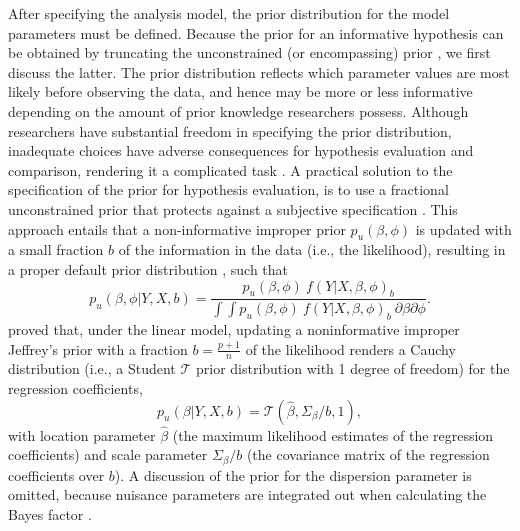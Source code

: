 \documentclass[
  authoryear,
  preprint,
  5p,
  twocolumn]{elsarticle}
\begin{document}
After specifying the analysis model, the prior distribution for the
model parameters must be defined. Because the prior for an informative
hypothesis can be obtained by truncating the unconstrained (or
encompassing) prior \citep[e.g.,][]{klugkist_inequality_2005}, we first
discuss the latter. The prior distribution reflects which parameter
values are most likely before observing the data, and hence may be more
or less informative depending on the amount of prior knowledge
researchers possess. Although researchers have substantial freedom in
specifying the prior distribution, inadequate choices have adverse
consequences for hypothesis evaluation and comparison, rendering it a
complicated task \citep{ohagan_fractional_1995}. A practical solution to
the specification of the prior for hypothesis evaluation, is to use a
fractional unconstrained prior \citep{ohagan_fractional_1995} that
protects against a subjective specification
\citep{gu_approximated_2018}. This approach entails that a
non-informative improper prior \(p_u(\beta, \phi)\) is updated with a
small fraction \(b\) of the information in the data (i.e., the
likelihood), resulting in a proper default prior distribution
\citep[e.g.,][]{mulder_equality_2010, gu_approximated_2018}, such that
\[
p_u(\beta, \phi|Y, X, b) = 
\frac{
  p_u(\beta, \phi) ~ f(Y|X, \beta, \phi)_b
}{
  \int \int p_u(\beta, \phi) ~ f(Y|X, \beta, \phi)_b ~ \partial \beta \partial \phi
}.
\] \citet{mulder_olssoncollentine_2019} proved that, under the linear
model, updating a noninformative improper Jeffrey's prior with a
fraction \(b = \frac{p+1}{n}\) of the likelihood renders a Cauchy
distribution (i.e., a Student \(\mathcal{T}\) prior distribution with 1
degree of freedom) for the regression coefficients, \[
p_u(\beta | Y, X, b) = \mathcal{T}(\hat{\beta}, \Sigma_\beta / b, 1),
\] with location parameter \(\hat{\beta}\) (the maximum likelihood
estimates of the regression coefficients) and scale parameter
\(\Sigma_{\beta} / b\) (the covariance matrix of the regression
coefficients over \(b\)). A discussion of the prior for the dispersion
parameter is omitted, because nuisance parameters are integrated out
when calculating the Bayes factor \citep{gu_approximated_2018}.
\end{document}

